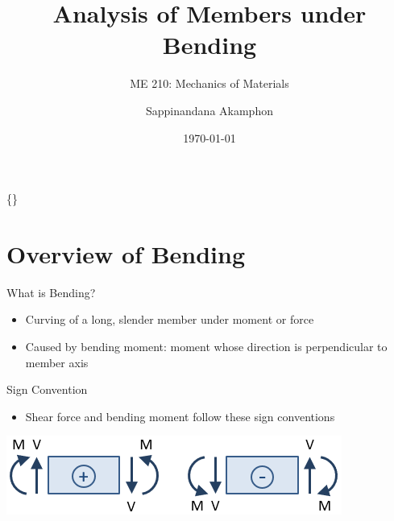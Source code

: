 \documentclass[10pt, svgnames]{beamer}
\author{Sappinandana Akamphon}
\date{\today}
\title{Analysis of Members under Bending}
\subtitle{ME 210: Mechanics of Materials}
\institute{Department of Mechanical Engineering, TSE}
\date{}
\begin{document}
\begin{frame}[label={sec:org39d9269}]{\{\}}
\maketitle
\end{frame}

\section{Overview of Bending}
\label{overview-of-bending}
\begin{frame}[label={sec:org8eee984}]{What is Bending?}
\begin{itemize}
\item Curving of a long, slender member under moment or force

\item Caused by bending moment: moment whose direction is perpendicular to member axis
\end{itemize}
\end{frame}

\begin{frame}[label={sec:org61fcb47}]{Sign Convention}
\begin{itemize}
\item Shear force and bending moment follow these sign conventions
\end{itemize}

\begin{center}
\includegraphics[width=.9\linewidth]{pictures/sign-convention.png}
\end{center}
\end{frame}
\end{document}
